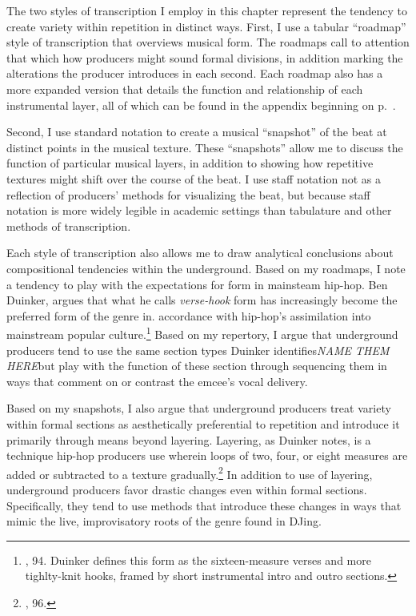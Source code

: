 The two styles of transcription I employ in this chapter represent the tendency to create variety within repetition in distinct ways. First, I use a tabular “roadmap” style of transcription that overviews musical form. The roadmaps call to attention that which how producers might sound formal divisions, in addition marking the alterations the producer introduces in each second. Each roadmap also has a more expanded version that details the function and relationship of each instrumental layer, all of which can be found in the appendix beginning on p.~\pageref{appendix:fullroadmaps}. 

Second, I use standard notation to create a musical ``snapshot'' of the beat at distinct points in the musical texture. These ``snapshots'' allow me to discuss the function of particular musical layers, in addition to showing how repetitive textures might shift over the course of the beat. I use staff notation not as a reflection of producers' methods for visualizing the beat, but because staff notation is more widely legible in academic settings than tabulature and other methods of transcription.

Each style of transcription also allows me to draw analytical conclusions about compositional tendencies within the underground. Based on my roadmaps, I note a tendency to play with the expectations for form in mainsteam hip-hop. Ben Duinker, argues that what he calls \emph{verse-hook} form has increasingly become the preferred form of the genre in. accordance with hip-hop's assimilation into mainstream popular culture.\footnote{\cite{benduinkerSongFormMainstreaming2020}, 94. Duinker defines this form as the sixteen-measure verses and more tighlty-knit hooks, framed by short instrumental intro and outro sections.} Based on my repertory, I argue that underground producers tend to use the same section types Duinker identifies\textemdash \textit{NAME THEM HERE}\textemdash but play with the function of these section through sequencing them in ways that comment on or contrast the emcee's vocal delivery.

Based on my snapshots, I also argue that underground producers treat variety within formal sections as aesthetically preferential to repetition and introduce it primarily through means beyond layering. Layering, as Duinker notes, is a technique hip-hop producers use wherein loops of two, four, or eight measures are added or subtracted to a texture gradually.\footnote{\cite{benduinkerSongFormMainstreaming2020}, 96.} In addition to use of layering, underground producers favor drastic changes even within formal sections. Specifically, they tend to use methods that introduce these changes in ways that mimic the live, improvisatory roots of the genre found in DJing.

